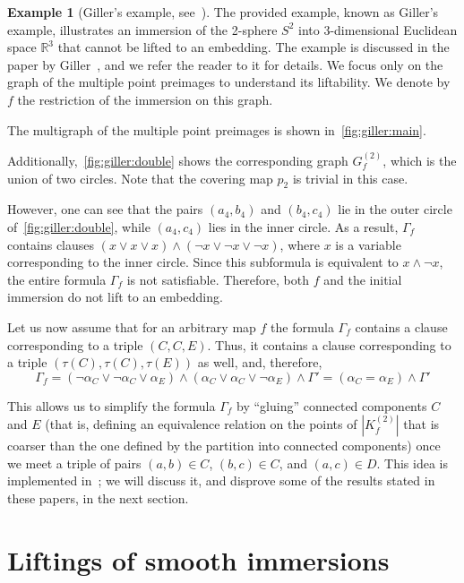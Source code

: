 \documentclass[a4paper,12pt,reqno,oneside]{amsart}
\theoremstyle{plain}
\theoremstyle{definition}
\newtheorem{example}{Example}
\theoremstyle{plain}
\begin{document}
\begin{example}[Giller's example, see~\cite{giller}]\label{ex:giller}
  The provided example, known as Giller's example, illustrates an immersion of the 2-sphere $S^2$ into
  3-dimensional Euclidean space $\mathbb{R}^3$ that cannot be lifted to an embedding. The example is
  discussed in the paper by Giller~\cite{giller}, and we refer the reader to it for details. We
  focus only on the graph of the multiple point preimages to understand its liftability. We denote
  by $f$ the restriction of the immersion on this graph.

  The multigraph of the multiple point preimages is shown in~\cref{fig:giller:main}.

  Additionally,~\cref{fig:giller:double} shows the corresponding graph $G^{(2)}_f$, which is the
  union of two circles. Note that the covering map $p_2$ is trivial in this case.

  However, one can see that the pairs $(a_4, b_4)$ and $(b_4, c_4)$ lie in the outer circle
  of~\cref{fig:giller:double}, while $(a_4, c_4)$ lies in the inner circle. As a result, $\Gamma_f$
  contains clauses $(x \lor x \lor x) \land (\neg x \lor \neg x \lor \neg x)$, where $x$ is a
  variable corresponding to the inner circle. Since this subformula is equivalent to
  $x \land \neg x$, the entire formula $\Gamma_f$ is not satisfiable. Therefore, both $f$ and the
  initial immersion do not lift to an embedding.
\end{example}

Let us now assume that for an arbitrary map $f$ the formula $\Gamma_f$ contains a clause
corresponding to a triple $(C, C, E)$. Thus, it contains a clause corresponding to a triple
$(\tau(C), \tau(C), \tau(E))$ as well, and, therefore,
\[
  \Gamma_f = (\neg \alpha_C \lor \neg \alpha_C \lor \alpha_E) \land (\alpha_C \lor \alpha_C \lor \neg
  \alpha_E) \land \Gamma' = (\alpha_C = \alpha_E) \land \Gamma'
\]

This allows us to simplify the formula $\Gamma_f$ by ``gluing'' connected components $C$ and $E$
(that is, defining an equivalence relation on the points of $|K^{(2)}_f|$ that is coarser than the
one defined by the partition into connected components) once we meet a triple of pairs
$(a, b) \in C$, $(b, c) \in C$, and $(a, c) \in D$. This idea is implemented in~\cite{poen,poen_fr};
we will discuss it, and disprove some of the results stated in these papers, in the next section.

\FloatBarrier

\section{Liftings of smooth immersions}
\end{document}
